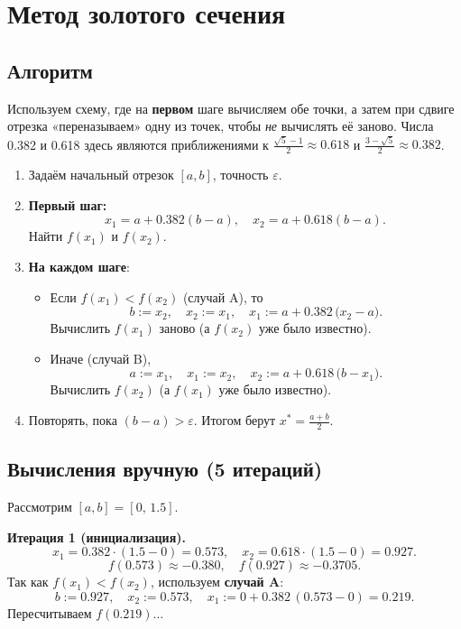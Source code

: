 \documentclass[12pt]{article}
\begin{document}
\section{Метод золотого сечения}

\subsection{Алгоритм}
Используем схему, где на \textbf{первом} шаге вычисляем обе точки, а затем при сдвиге отрезка «переназываем» одну из точек, чтобы \emph{не} вычислять её заново. Числа 0.382 и 0.618 здесь являются приближениями к \(\frac{\sqrt{5}-1}{2}\approx 0.618\) и \(\frac{3-\sqrt{5}}{2}\approx0.382\).  

\begin{enumerate}
    \item Задаём начальный отрезок $[a,b]$, точность $\varepsilon$.
    \item \textbf{Первый шаг:}
    \[
       x_1 = a + 0.382(b - a),
       \quad
       x_2 = a + 0.618(b - a).
    \]
    Найти $f(x_1)$ и $f(x_2)$.
    \item \textbf{На каждом шаге}:
    \begin{itemize}
      \item Если $f(x_1) < f(x_2)$ (случай A), то
        \[
          b := x_2,\quad 
          x_2 := x_1,\quad
          x_1 := a + 0.382\,\bigl(x_2 - a\bigr).
        \]
        Вычислить $f(x_1)$ заново (а $f(x_2)$ уже было известно).
      \item Иначе (случай B), 
        \[
          a := x_1,\quad
          x_1 := x_2,\quad
          x_2 := a + 0.618\,\bigl(b - x_1\bigr).
        \]
        Вычислить $f(x_2)$ (а $f(x_1)$ уже было известно).
    \end{itemize}
    \item Повторять, пока $(b-a)>\varepsilon$. Итогом берут $x^*=\frac{a+b}{2}$.
\end{enumerate}

\subsection{Вычисления вручную (5 итераций)}

Рассмотрим $[a,b] = [0,\,1.5]$.

\textbf{Итерация 1 (инициализация).}
\[
x_1=0.382\cdot(1.5-0)=0.573,\quad
x_2=0.618\cdot(1.5-0)=0.927.
\]
\[
f(0.573)\approx -0.380,\quad f(0.927)\approx -0.3705.
\]
Так как $f(x_1)<f(x_2)$, используем \textbf{случай A}:
\[
b := 0.927,\quad x_2 := 0.573,\quad
x_1 := 0 + 0.382\,(0.573 - 0)=0.219.
\]
Пересчитываем $f(0.219)\dots$
\end{document}
